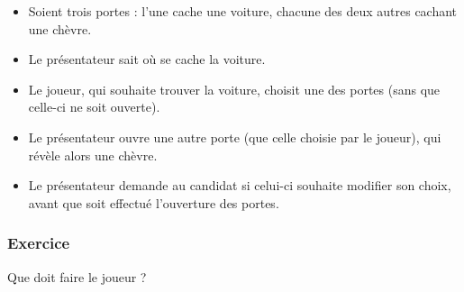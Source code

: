 
$~$
\begin{itemize}
\item Soient trois portes :
 l'une cache une voiture, chacune des deux autres cachant une chèvre.
\item Le présentateur sait où se cache la voiture.
\item Le joueur, qui souhaite trouver la voiture, 
	choisit une des portes (sans que celle-ci ne soit ouverte).
\item Le présentateur ouvre une autre porte (que celle choisie par le joueur), qui révèle alors une chèvre.
\item Le présentateur demande au candidat si celui-ci souhaite modifier son choix, 
	avant que soit effectué l'ouverture des portes.
\end{itemize}



\subsubsection*{Exercice}
Que doit faire le joueur ?
